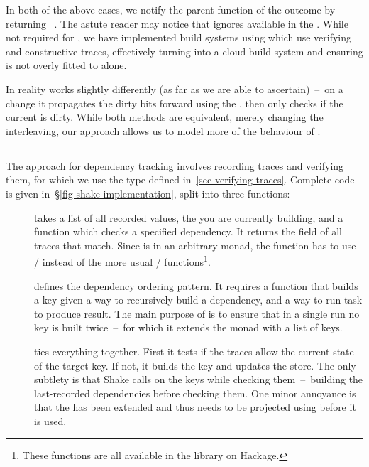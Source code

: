 In both of the above cases, we notify the parent  function of
the outcome by returning ~. The astute reader may notice
that  ignores  available in the .
While not required for \Excel, we have implemented build systems using
 which use verifying and constructive traces, effectively turning
\Excel into a cloud build system and ensuring  is not overly
fitted to \Excel alone.

In reality \Excel works slightly differently (as far as we are able to
ascertain)~--~on a change it propagates the dirty bits forward using the
, then only checks if the current  is dirty.
While both methods are equivalent, merely changing the interleaving, our
approach allows us to model more of the behaviour of \Excel.

\vspace{-2mm}
\subsection{\Shake}\label{sec-implementation-shake}
\vspace{-1mm}

The \Shake approach for dependency tracking involves recording traces and
verifying them, for which we use the  type defined
in~\ref{sec-verifying-traces}. Complete code is given
in~\S\ref{fig-shake-implementation}, split into three functions:

\begin{description}
\item[] takes a list of all recorded  values, the
     you are currently building, and a function  which checks
    a specified dependency. It returns the  field of all traces that
    match. Since  is in an arbitrary monad, the function has to use
    /\hs{&&^} instead of the more usual /\hs{&&}
    functions\footnote{These functions are all available in the 
    library on Hackage.}.
\item[] defines the dependency ordering pattern. It requires a
     function that builds a key given a way to recursively build a
    dependency, and a way to run task to produce result. The main purpose of
     is to ensure that in a single run no key is built twice~--~for
    which it extends the  monad with a list of  keys.
\item[] ties everything together. First it tests if the traces allow
the current state of the target key. If not, it builds the key and updates the
store. The only subtlety is that Shake calls  on the keys while
checking them~--~building the last-recorded dependencies before checking them.
One minor annoyance is that the  has been extended and thus needs to
be projected using  before it is used.
\end{description}

